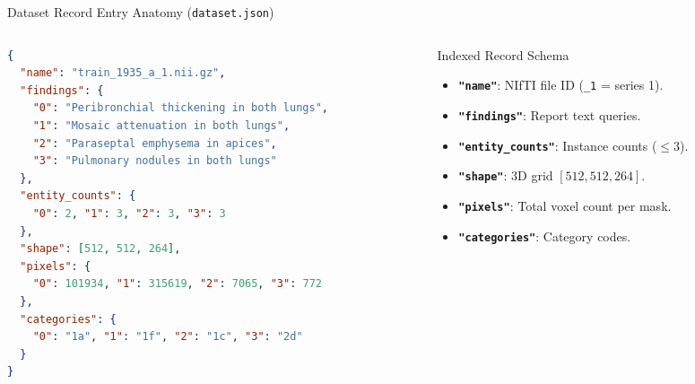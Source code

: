 \documentclass[aspectratio=169, 10pt]{beamer}
\begin{document}
\begin{frame}[fragile]{Dataset Record Entry Anatomy (\texttt{dataset.json})}
    \begin{columns}[c]
        \begin{column}{0.58\textwidth}
\begin{lstlisting}[language=json,basicstyle=\ttfamily\scriptsize]
{
  "name": "train_1935_a_1.nii.gz",
  "findings": {
    "0": "Peribronchial thickening in both lungs",
    "1": "Mosaic attenuation in both lungs",
    "2": "Paraseptal emphysema in apices",
    "3": "Pulmonary nodules in both lungs"
  },
  "entity_counts": {
    "0": 2, "1": 3, "2": 3, "3": 3
  },
  "shape": [512, 512, 264],
  "pixels": {
    "0": 101934, "1": 315619, "2": 7065, "3": 772
  },
  "categories": {
    "0": "1a", "1": "1f", "2": "1c", "3": "2d"
  }
}
\end{lstlisting}
        \end{column}
        \begin{column}{0.40\textwidth}
            \begin{block}{Indexed Record Schema}
                \scriptsize
                \begin{itemize}
                    \item \textbf{\texttt{"name"}}: NIfTI file ID (\texttt{\_1} = series 1).
                    \item \textbf{\texttt{"findings"}}: Report text queries.
                    \item \textbf{\texttt{"entity\_counts"}}: Instance counts ($\le 3$).
                    \item \textbf{\texttt{"shape"}}: 3D grid $[512, 512, 264]$.
                    \item \textbf{\texttt{"pixels"}}: Total voxel count per mask.
                    \item \textbf{\texttt{"categories"}}: Category codes.
                \end{itemize}
            \end{block}
        \end{column}
    \end{columns}

\end{frame}
\end{document}
